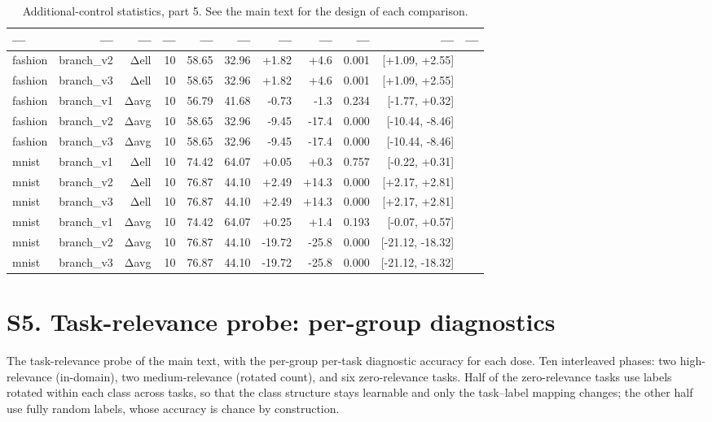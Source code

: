 \documentclass[10pt]{article}
\begin{document}
\begin{table}[h]
\centering\scriptsize
\caption{Additional-control statistics, part 5. See the main text for the design of each comparison.}
\label{tab:sup-s5-5}
\begin{tabular}{lrrrrrrrrrr}
\toprule
--- & --- & --- & --- & --- & --- & --- & --- & --- & --- & --- \\
\midrule
fashion & branch\_v2 & Δell & 10 & 58.65 & 32.96 & +1.82 & +4.6 & 0.001 & [+1.09, +2.55] \\
fashion & branch\_v3 & Δell & 10 & 58.65 & 32.96 & +1.82 & +4.6 & 0.001 & [+1.09, +2.55] \\
fashion & branch\_v1 & Δavg & 10 & 56.79 & 41.68 & -0.73 & -1.3 & 0.234 & [-1.77, +0.32] \\
fashion & branch\_v2 & Δavg & 10 & 58.65 & 32.96 & -9.45 & -17.4 & 0.000 & [-10.44, -8.46] \\
fashion & branch\_v3 & Δavg & 10 & 58.65 & 32.96 & -9.45 & -17.4 & 0.000 & [-10.44, -8.46] \\
mnist & branch\_v1 & Δell & 10 & 74.42 & 64.07 & +0.05 & +0.3 & 0.757 & [-0.22, +0.31] \\
mnist & branch\_v2 & Δell & 10 & 76.87 & 44.10 & +2.49 & +14.3 & 0.000 & [+2.17, +2.81] \\
mnist & branch\_v3 & Δell & 10 & 76.87 & 44.10 & +2.49 & +14.3 & 0.000 & [+2.17, +2.81] \\
mnist & branch\_v1 & Δavg & 10 & 74.42 & 64.07 & +0.25 & +1.4 & 0.193 & [-0.07, +0.57] \\
mnist & branch\_v2 & Δavg & 10 & 76.87 & 44.10 & -19.72 & -25.8 & 0.000 & [-21.12, -18.32] \\
mnist & branch\_v3 & Δavg & 10 & 76.87 & 44.10 & -19.72 & -25.8 & 0.000 & [-21.12, -18.32] \\
\bottomrule
\end{tabular}
\end{table}

\section{S5. Task-relevance probe: per-group diagnostics}
\noindent The task-relevance probe of the main text, with the
per-group per-task diagnostic accuracy for each dose. Ten interleaved
phases: two high-relevance (in-domain), two medium-relevance (rotated
count), and six zero-relevance tasks. Half of the zero-relevance tasks use
labels rotated within each class across tasks, so that the class structure
stays learnable and only the task--label mapping changes; the other half
use fully random labels, whose accuracy is chance by construction.
\end{document}
